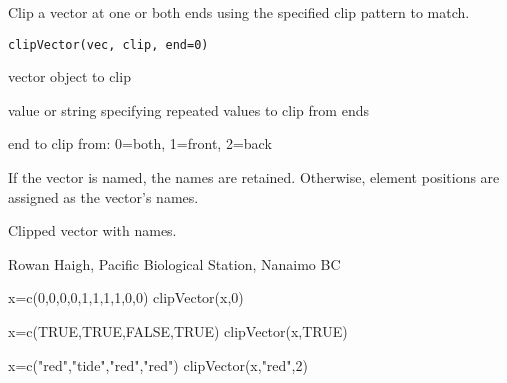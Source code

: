 \documentclass[letterpaper]{book}
\begin{document}
\begin{Description}\relax
Clip a vector at one or both ends using the specified clip 
pattern to match.
\end{Description}
\begin{Usage}
\begin{verbatim}
clipVector(vec, clip, end=0)
\end{verbatim}
\end{Usage}
\begin{Arguments}
\begin{ldescription}
\item[\code{vec}] vector object to clip
\item[\code{clip}] value or string specifying repeated values to clip from ends
\item[\code{end}] end to clip  from: 0=both, 1=front, 2=back
\end{ldescription}
\end{Arguments}
\begin{Details}\relax
If the vector is named, the names are retained. Otherwise,
element positions are assigned as the vector's names.
\end{Details}
\begin{Value}
Clipped vector with names.
\end{Value}
\begin{Author}\relax
Rowan Haigh, Pacific Biological Station, Nanaimo BC
\end{Author}
\begin{SeeAlso}\relax
{}
\end{SeeAlso}
\begin{Examples}
\begin{ExampleCode}
x=c(0,0,0,0,1,1,1,1,0,0)
clipVector(x,0)

x=c(TRUE,TRUE,FALSE,TRUE)
clipVector(x,TRUE)

x=c("red","tide","red","red")
clipVector(x,"red",2)
\end{ExampleCode}
\end{Examples}
\end{document}
